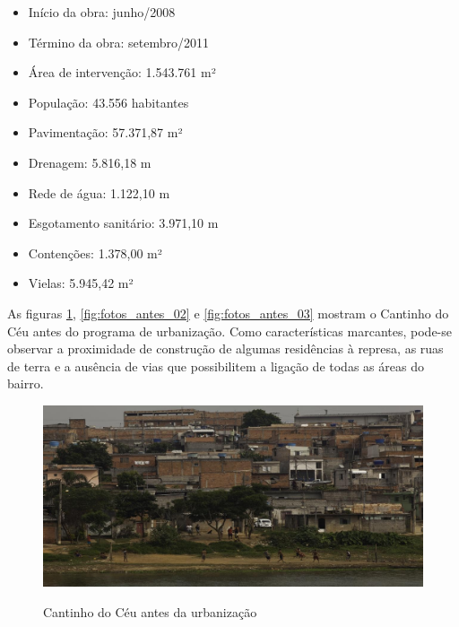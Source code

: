 	\begin{citacao}
		\begin{itemize}[leftmargin=\leftskip+-]
			\item Início da obra: junho/2008
			\item Término da obra: setembro/2011
			\item Área de intervenção: 1.543.761 m²
			\item População: 43.556 habitantes
			\item Pavimentação: 57.371,87 m²
			\item Drenagem: 5.816,18 m
			\item Rede de água: 1.122,10 m
			\item Esgotamento sanitário: 3.971,10 m
			\item Contenções: 1.378,00 m²
			\item Vielas: 5.945,42 m²
		\end{itemize}
		\cite[p.110]{Barda2012}
	\end{citacao}
	
	As figuras \ref{fig:fotos_antes_01}, \ref{fig:fotos_antes_02} e \ref{fig:fotos_antes_03} mostram o Cantinho do Céu antes do programa de urbanização. Como características marcantes, pode-se observar a proximidade de construção de algumas residências à represa, as ruas de terra e a ausência de vias que possibilitem a ligação de todas as áreas do bairro.
	
	\begin{figure}[hb]
		\centering
		\caption{Cantinho do Céu antes da urbanização}
		\includegraphics[width=\linewidth]{img/knoll_antes01}
		\label{fig:fotos_antes_01}
	\end{figure}
	
